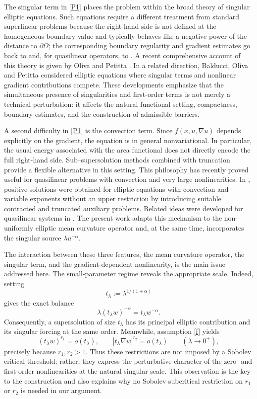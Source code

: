 \documentclass[11pt,leqno]{amsart}
\begin{document}
The singular term in \eqref{P1} places the problem within the broad
theory of singular elliptic equations. Such equations require a
different treatment from standard superlinear problems because the
right-hand side is not defined at the homogeneous boundary value and
typically behaves like a negative power of the distance to
$\partial\Omega$; the corresponding boundary regularity and gradient
estimates go back to \cite{delPino,GuiLin} and, for quasilinear
operators, to \cite{GiacomoniSchindlerTakac}. A recent comprehensive account of this theory is
given by Oliva and Petitta \cite{OP2025}. In a related direction,
Balducci, Oliva and Petitta \cite{BOP2024} considered elliptic equations
where singular terms and nonlinear gradient contributions compete.
These developments emphasize that the simultaneous presence of
singularities and first-order terms is not merely a technical
perturbation: it affects the natural functional setting, compactness,
boundary estimates, and the construction of admissible barriers.

A second difficulty in \eqref{P1} is the convection term. Since
$f(x,u,\nabla u)$ depends explicitly on the gradient, the equation is in
general nonvariational. In particular, the usual energy associated with
the area functional does not directly encode the full right-hand side.
Sub--supersolution methods combined with truncation provide a flexible
alternative in this setting. This philosophy has recently proved useful
for quasilinear problems with convection and very large nonlinearities.
In \cite{AFM2024}, positive solutions were obtained for elliptic
equations with convection and variable exponents without an upper
restriction by introducing suitable contracted and truncated auxiliary
problems. Related ideas were developed for quasilinear systems in
\cite{AFMsys2024}. The present work adapts this mechanism to the
non-uniformly elliptic mean curvature operator and, at the same time,
incorporates the singular source $\lambda u^{-\alpha}$.

The interaction between these three features, the mean curvature
operator, the singular term, and the gradient-dependent
nonlinearity, is the main issue addressed here. The small-parameter
regime reveals the appropriate scale. Indeed, setting
\[
t_\lambda:=\lambda^{1/(1+\alpha)}
\]
gives the exact balance
\[
\lambda(t_\lambda w)^{-\alpha}
=t_\lambda w^{-\alpha}.
\]
Consequently, a supersolution of size $t_\lambda$ has its principal
elliptic contribution and its singular forcing at the same order.
Meanwhile, assumption \eqref{f} yields
\[
(t_\lambda w)^{r_1}=o(t_\lambda),
\qquad
|t_\lambda\nabla w|^{r_2}=o(t_\lambda)
\qquad(\lambda\to0^+),
\]
precisely because $r_1,r_2>1$. Thus these restrictions are not imposed
by a Sobolev critical threshold; rather, they express the perturbative
character of the zero- and first-order nonlinearities at the natural
singular scale. This observation is the key to the construction and
also explains why no Sobolev subcritical restriction on $r_1$ or
$r_2$ is needed in our argument.
\end{document}
